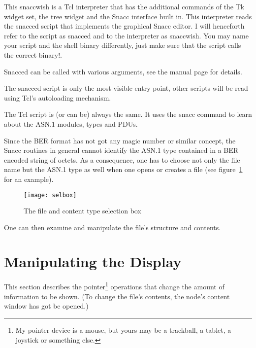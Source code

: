 This {\ufn snaccwish} is a Tcl interpreter that has the additional commands of the Tk widget set, the tree widget and the Snacc interface built in.
This interpreter reads the {\ufn snacced} script that implements the graphical Snacc editor.
I will henceforth refer to the script as {\ufn snacced} and to the interpreter as {\ufn snaccwish}.
You may name your script and the shell binary differently, just make sure that the script calls the correct binary!.

Snacced can be called with various arguments, see the manual page for details.

The {\ufn snacced} script is only the most visible entry point, other scripts will be read using Tcl's autoloading mechanism.

The Tcl script is (or can be) always the same.
It uses the {\Tcl snacc} command to learn about the ASN.1 modules, types and PDUs.

Since the BER format has not got any magic number or similar concept, the Snacc routines in general cannot identify the ASN.1 type contained in a BER encoded string of octets.
As a consequence, one has to choose not only the file name but the ASN.1 type as well when one opens or creates a file (see figure~\ref{selbox-pic}  for an example).

\begin{figure}[ht]
\begin{center}
\texttt{[image: selbox]}
\caption{The file and content type selection box}
\label{selbox-pic}
\end{center}
\end{figure}

One can then examine and manipulate the file's structure and contents.

\section{Manipulating the Display}

This section describes the pointer\footnote{
  My pointer device is a mouse, but yours may be a trackball, a tablet, a joystick or something else.
} operations that change the amount of information to be shown.
(To change the file's contents, the node's content window has got be opened.)

